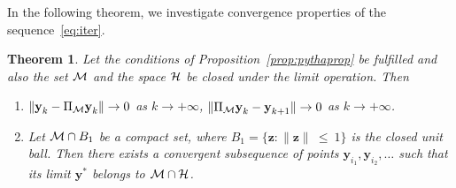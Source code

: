 \documentclass[sii]{ipart}
\newtheorem{theorem}{Theorem}
\newcommand{\bfy}{\textbf{y}}
\newcommand{\bfz}{\textbf{z}}
\begin{document}
In the following theorem, we investigate convergence properties of the sequence~\eqref{eq:iter}.

\begin{theorem}
	\label{th:converg}
		Let the conditions of Proposition~\ref{prop:pythaprop} be fulfilled and also the set $\mathcal{M}$ and the space $\mathcal{H}$ be closed under the limit operation. Then
	\begin{enumerate}
		\item $\|\bfy_k - \Pi_{\calM}\bfy_k\| \to 0$ as $k \to +\infty$, $\|\Pi_{\calM}\bfy_k - \bfy_{k+1}\| \to 0$ as $k \to +\infty$.
		\item Let $\mathcal{M} \cap B_1$ be a compact set, where $B_1=\{\bfz: \|\bfz\|~\le~1\}$ is the closed unit ball. Then there exists a convergent subsequence of points $\bfy_{i_1}, \bfy_{i_2}, \ldots$ such that its limit $\bfy^*$ belongs to $\mathcal{M} \cap \mathcal{H}$.
	\end{enumerate}
\end{theorem}
\end{document}
